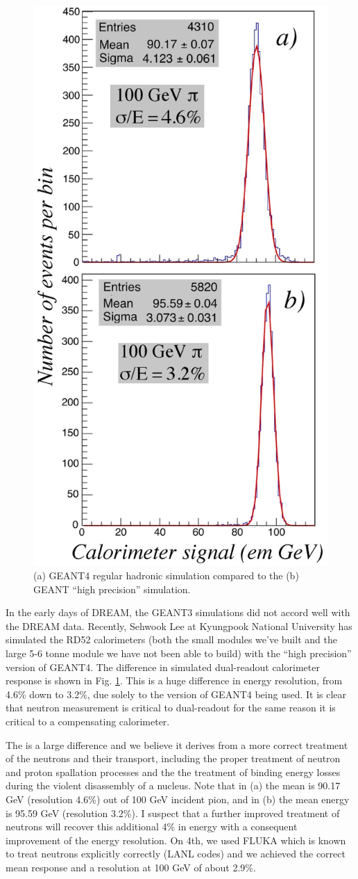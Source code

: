 \begin{figure}
 \centering
 \includegraphics[width=.5\linewidth]{Calorimeter/DualReadout/f41-geant.jpg}
 \caption{(a) GEANT4 regular hadronic simulation compared to the (b) GEANT ``high precision'' simulation.}
 \label{fig:hp}
\end{figure}
In the early days of DREAM, the GEANT3 simulations did not accord well with the DREAM data.  Recently, Sehwook Lee
at Kyungpook National University has simulated the RD52 calorimeters (both the small modules we've built and the large
5-6 tonne module we have not been able to build) with the ``high precision'' version of GEANT4.  The difference in simulated dual-readout calorimeter response is shown in Fig. \ref{fig:hp}.  This is a huge difference in energy resolution, from 4.6\% down to 3.2\%, due solely to the version of GEANT4
being used. It is clear that neutron measurement is critical to 
dual-readout for the same reason it is critical to a compensating calorimeter.


The is a large difference and we believe it derives from a more correct treatment of the neutrons and their transport, including the proper treatment of neutron and proton spallation processes and the the treatment of binding energy losses during the violent disassembly of a nucleus.   Note that in (a) the mean is 90.17 GeV (resolution 4.6\%) out of 100 GeV incident pion, and in (b) the mean energy is 95.59 GeV (resolution 3.2\%).  I suspect that a further improved treatment of neutrons will recover this additional 4\% in energy with a consequent improvement of the energy resolution. On 4th, we used FLUKA which is known to treat neutrons explicitly correctly (LANL codes) and we achieved the correct mean response and a resolution at 100 GeV of about 2.9\%.

